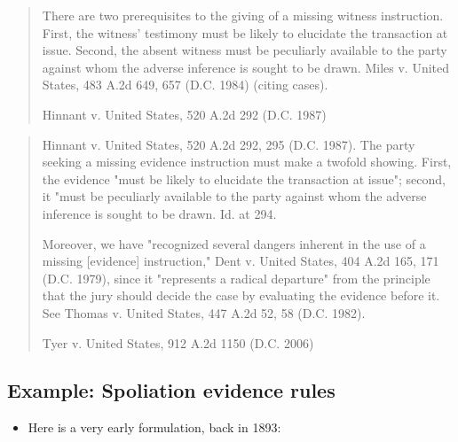 \documentclass[
  10pt,
  dvipsnames,enabledeprecatedfontcommands]{scrartcl}
\providecommand{\tightlist}{%
  \setlength{\itemsep}{0pt}\setlength{\parskip}{0pt}}
\begin{document}
\begin{quote}
There are two prerequisites to the giving of a missing witness instruction. First, the witness' testimony must be likely to elucidate the transaction at issue. Second, the absent witness must be peculiarly available to the party against whom the adverse inference is sought to be drawn. Miles v. United States, 483 A.2d 649, 657 (D.C. 1984) (citing cases).

Hinnant v. United States, 520 A.2d 292 (D.C. 1987)
\end{quote}

\begin{quote} 
Hinnant v. United States, 520 A.2d 292, 295 (D.C. 1987). The party seeking a missing evidence instruction must make a twofold showing. First, the evidence "must be likely to elucidate the transaction at issue"; second, it "must be peculiarly available to the party against whom the adverse inference is sought to be drawn. Id. at 294.

Moreover, we have "recognized several dangers inherent in the use of a missing [evidence] instruction," Dent v. United States, 404 A.2d 165, 171 (D.C. 1979), since it "represents a radical departure" from the principle that the jury should decide the case by evaluating the evidence before it. See Thomas v. United States, 447 A.2d 52, 58 (D.C. 1982).

Tyer v. United States, 912 A.2d 1150 (D.C. 2006)
\end{quote}


\hypertarget{example-spoliation-evidence-rules}{%
\subsection{Example: Spoliation evidence
rules}\label{example-spoliation-evidence-rules}}

\begin{itemize}
\tightlist
\item
  Here is a very early formulation, back in 1893:
\end{itemize}
\end{document}
